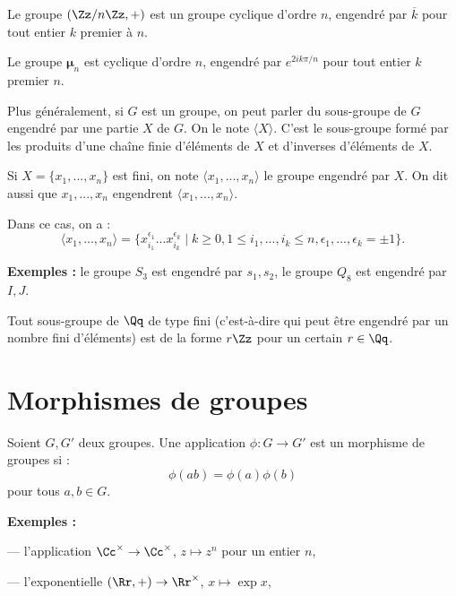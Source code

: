 \documentclass[class=report,crop=false]{standalone}
\begin{document}
\begin{exercicecours}

Le groupe $(\Zz/n\Zz,+)$ est un groupe cyclique d'ordre $n$, engendré par $\overline{k}$ pour tout entier $k$ premier à $n$.
\end{exercicecours}


\begin{exercicecours}
Le groupe  {$ \mathbf{\mu}_n$} est cyclique d'ordre $n$, engendré par $e^{2ik\pi/n}$ pour tout entier $k$ premier $n$.
\end{exercicecours}

Plus généralement, si $G$ est un groupe, on peut parler du sous-groupe de $G$ engendré par une partie $X$ de $G$. On le note $\langle X\rangle$. C'est le sous-groupe formé par les produits d'une cha\^ine finie d'éléments de $X$ et d'inverses d'éléments de $X$.

Si $X=\{x_1,...,x_n\}$ est fini, on note $\langle x_1,...,x_n\rangle$ le groupe engendré par $X$. On dit aussi que $x_1,...,x_n$ engendrent $\langle x_1,...,x_n\rangle$. 

Dans ce cas, on a :
\[\langle x_1,...,x_n\rangle = \{x_{i_1}^{\epsilon_1}...x_{i_k}^{\epsilon_k} \mid k \ge 0, 1 \le i_1,...,i_k \le n, \epsilon_1,...,\epsilon_k = \pm 1\}.\]

{\bf Exemples :} le groupe $S_3$ est engendré par $s_1,s_2$, le groupe $Q_8$ est engendré par $I,J$. 

\begin{exercicecours}
Tout sous-groupe de $\Qq$ de type fini (c'est-à-dire qui peut être engendré par un nombre fini d'éléments) est de la forme $r \Zz$ pour un certain $r \in \Qq$.
\end{exercicecours}

\section{Morphismes de groupes}
\begin{definition}
Soient $G,G'$ deux groupes. Une application $\phi : G \to G'$ est un morphisme de groupes si :\[\phi(ab)=\phi(a)\phi(b)\]
pour tous $a,b \in G$.
\end{definition}


{\bf Exemples :} 

--- l'application $\Cc^\times \to \Cc^\times$, $z \mapsto z^n$ pour un entier $n$,

--- l'exponentielle  $(\Rr,+) \to \Rr^\times$, $x \mapsto \exp x$, 
\end{document}
